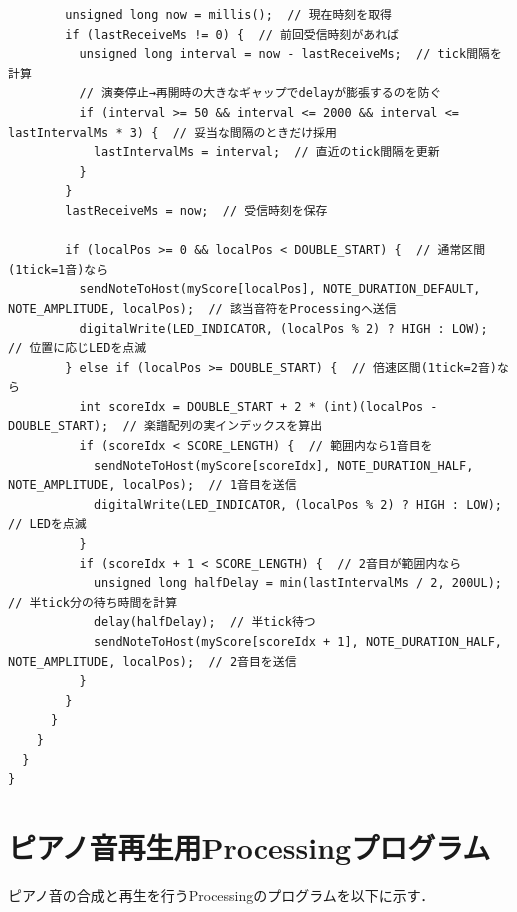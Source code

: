 \documentclass[uplatex,dvipdfmx]{jlreq}
\begin{document}
\begin{lstlisting}
        unsigned long now = millis();  // 現在時刻を取得
        if (lastReceiveMs != 0) {  // 前回受信時刻があれば
          unsigned long interval = now - lastReceiveMs;  // tick間隔を計算
          // 演奏停止→再開時の大きなギャップでdelayが膨張するのを防ぐ
          if (interval >= 50 && interval <= 2000 && interval <= lastIntervalMs * 3) {  // 妥当な間隔のときだけ採用
            lastIntervalMs = interval;  // 直近のtick間隔を更新
          }
        }
        lastReceiveMs = now;  // 受信時刻を保存

        if (localPos >= 0 && localPos < DOUBLE_START) {  // 通常区間(1tick=1音)なら
          sendNoteToHost(myScore[localPos], NOTE_DURATION_DEFAULT, NOTE_AMPLITUDE, localPos);  // 該当音符をProcessingへ送信
          digitalWrite(LED_INDICATOR, (localPos % 2) ? HIGH : LOW);  // 位置に応じLEDを点滅
        } else if (localPos >= DOUBLE_START) {  // 倍速区間(1tick=2音)なら
          int scoreIdx = DOUBLE_START + 2 * (int)(localPos - DOUBLE_START);  // 楽譜配列の実インデックスを算出
          if (scoreIdx < SCORE_LENGTH) {  // 範囲内なら1音目を
            sendNoteToHost(myScore[scoreIdx], NOTE_DURATION_HALF, NOTE_AMPLITUDE, localPos);  // 1音目を送信
            digitalWrite(LED_INDICATOR, (localPos % 2) ? HIGH : LOW);  // LEDを点滅
          }
          if (scoreIdx + 1 < SCORE_LENGTH) {  // 2音目が範囲内なら
            unsigned long halfDelay = min(lastIntervalMs / 2, 200UL);  // 半tick分の待ち時間を計算
            delay(halfDelay);  // 半tick待つ
            sendNoteToHost(myScore[scoreIdx + 1], NOTE_DURATION_HALF, NOTE_AMPLITUDE, localPos);  // 2音目を送信
          }
        }
      }
    }
  }
}

\end{lstlisting}

\section{ピアノ音再生用Processingプログラム}
\label{sec:codep-pde}

ピアノ音の合成と再生を行うProcessingのプログラムを以下に示す．
\end{document}
